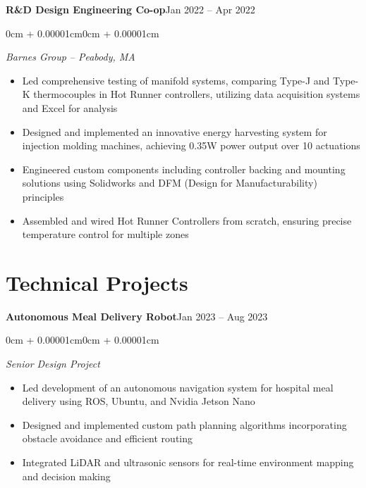 \documentclass[10pt, letterpaper]{article}
\newenvironment{highlights}{
    \begin{itemize}[
        leftmargin=0.5cm,
        rightmargin=0cm,
        itemindent=0cm,
        labelwidth=0.3cm,
        labelsep=0.2cm,
        align=left,
        itemsep=0.05cm,
        topsep=0.05cm,
        parsep=0.05cm,
        partopsep=0pt
    ]
}{
    \end{itemize}
    \vspace{0.1cm}
}
\newenvironment{onecolentry}{
    \begin{adjustwidth}{0cm + 0.00001cm}{0cm + 0.00001cm}
}{
    \end{adjustwidth}
}
\begin{document}
    \begin{twocolentry}{\textbf{R\&D Design Engineering Co-op}}{Jan 2022 -- Apr 2022}
    \end{twocolentry}
    \begin{onecolentry}
    \textit{Barnes Group -- Peabody, MA}
    \begin{highlights}
        \item Led comprehensive testing of manifold systems, comparing Type-J and Type-K thermocouples in Hot Runner controllers, utilizing data acquisition systems and Excel for analysis
        \item Designed and implemented an innovative energy harvesting system for injection molding machines, achieving 0.35W power output over 10 actuations
        \item Engineered custom components including controller backing and mounting solutions using Solidworks and DFM (Design for Manufacturability) principles
        \item Assembled and wired Hot Runner Controllers from scratch, ensuring precise temperature control for multiple zones
    \end{highlights}
    \end{onecolentry}

    \section{Technical Projects}
    \begin{twocolentry}{\textbf{Autonomous Meal Delivery Robot}}{Jan 2023 -- Aug 2023}
    \end{twocolentry}
    \begin{onecolentry}
    \textit{Senior Design Project}
    \begin{highlights}
        \item Led development of an autonomous navigation system for hospital meal delivery using ROS, Ubuntu, and Nvidia Jetson Nano
        \item Designed and implemented custom path planning algorithms incorporating obstacle avoidance and efficient routing
        \item Integrated LiDAR and ultrasonic sensors for real-time environment mapping and decision making
    \end{highlights}
    \end{onecolentry}
\end{document}

